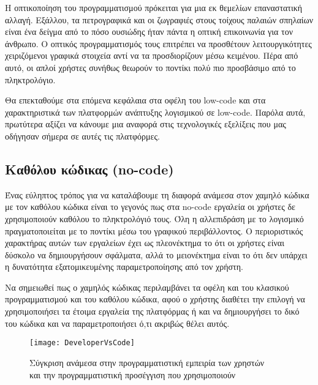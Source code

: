                 Η οπτικοποίηση του προγραμματισμού πρόκειται για μια εκ θεμελίων επαναστατική αλλαγή. Εξάλλου, τα πετρογραφικά και οι ζωγραφιές στους τοίχους παλαιών σπηλαίων είναι ένα δείγμα από το πόσο ουσιώδης ήταν πάντα η οπτική επικοινωνία για τον άνθρωπο. \cite{CASEKuhn}  Ο οπτικός προγραμματισμός τους επιτρέπει να προσθέτουν λειτουργικότητες χειριζόμενοι γραφικά στοιχεία αντί να τα προσδιορίζουν μέσω κειμένου. Πέρα από αυτό, οι απλοί χρήστες συνήθως θεωρούν το ποντίκι πολύ πιο προσβάσιμο από το πληκτρολόγιο.

                Θα επεκταθούμε στα επόμενα κεφάλαια στα οφέλη του low-code και στα χαρακτηριστικά των πλατφορμών ανάπτυξης λογισμικού σε low-code. Παρόλα αυτά, πρωτύτερα αξίζει να κάνουμε μια αναφορά στις τεχνολογικές εξελίξεις που μας οδήγησαν σήμερα σε αυτές τις πλατφόρμες.

            \subsection{Καθόλου κώδικας (no-code)}
                Ένας εύληπτος τρόπος για να καταλάβουμε τη διαφορά ανάμεσα στον χαμηλό κώδικα με τον καθόλου κώδικα είναι το γεγονός πως στα no-code εργαλεία οι χρήστες δε χρησιμοποιούν καθόλου το πληκτρολόγιό τους. Όλη η αλλεπιδράση με το λογισμικό πραγματοποιείται με το ποντίκι μέσω του γραφικού περιβάλλοντος. Ο περιοριστικός χαρακτήρας αυτών των εργαλείων έχει ως πλεονέκτημα το ότι οι χρήστες είναι δύσκολο να δημιουργήσουν σφάλματα, αλλά το μειονέκτημα είναι το ότι δεν υπάρχει η δυνατότητα εξατομικευμένης παραμετροποίησης από τον χρήστη.

                Να σημειωθεί πως ο χαμηλός κώδικας περιλαμβάνει τα οφέλη και του κλασικού προγραμματισμού και του καθόλου κώδικα, αφού ο χρήστης διαθέτει την επιλογή να χρησιμοποιήσει τα έτοιμα εργαλεία της πλατφόρμας ή και να δημιουργήσει το δικό του κώδικα και να παραμετροποιήσει ό,τι ακριβώς θέλει αυτός.

                \begin{figure}[h!] \noindent \centering
                        \texttt{[image: DeveloperVsCode]}
                        \caption{\centering Σύγκριση ανάμεσα στην προγραμματιστική εμπειρία των χρηστών \\ και την προγραμματιστική προσέγγιση που χρησιμοποιούν \cite{LowCodeSimon}}
                \end{figure}

